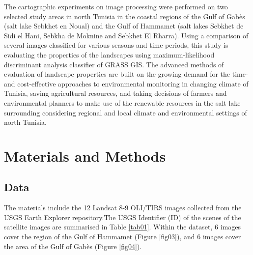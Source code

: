\documentclass[land,article,submit,pdftex,moreauthors]{Definitions/mdpi}
\begin{document}
The cartographic experiments on image processing were performed on two selected study areas in north Tunisia in the coastal regions of the Gulf of Gabès (salt lake Sebkhet en Noual) and the Gulf of Hammamet (salt lakes Sebkhet de Sidi el Hani, Sebkha de Moknine and Sebkhet El Rharra). Using a comparison of several images classified for various seasons and time periods, this study is evaluating the properties of the landscapes using maximum-likelihood discriminant analysis classifier of GRASS GIS. The advanced methods of evaluation of landscape properties are built on the growing demand for the time- and cost-effective approaches to environmental monitoring in changing climate of Tunisia, saving agricultural resources, and taking decisions of farmers and environmental planners to make use of the renewable resources in the salt lake surrounding considering regional and local climate and environmental settings of north Tunisia.

\section{Materials and Methods}

\subsection{Data}

The materials include the 12 Landsat 8-9 OLI/TIRS images collected from the USGS Earth Explorer repository.The USGS Identifier (ID) of the scenes of the satellite images are summarised in Table \ref{tab01}. Within the dataset, 6 images cover the region of the Gulf of Hammamet (Figure \ref{fig03}), and 6 images cover the area of the Gulf of Gabès (Figure \ref{fig04}). 
\end{document}
